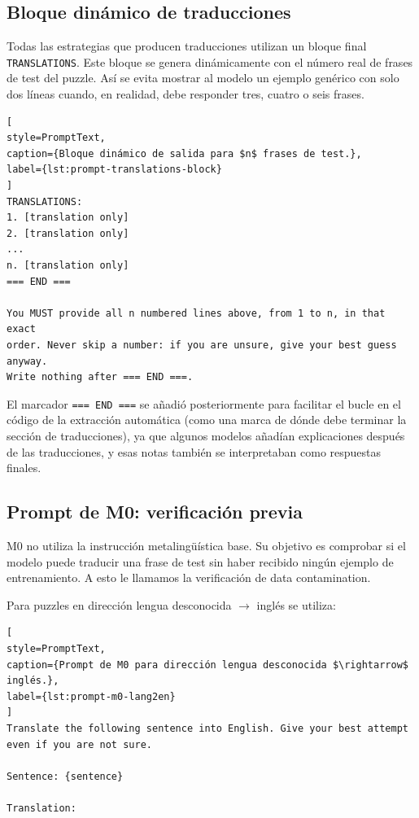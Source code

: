 \subsection{Bloque dinámico de traducciones}
\label{subsec:formato-salida}

Todas las estrategias que producen traducciones utilizan un bloque final \texttt{TRANSLATIONS}. Este bloque se genera dinámicamente con el número real de frases de test del puzzle. Así se evita mostrar al modelo un ejemplo genérico con solo dos líneas cuando, en realidad, debe responder tres, cuatro o seis frases.

\begin{lstlisting}[
style=PromptText,
caption={Bloque dinámico de salida para $n$ frases de test.},
label={lst:prompt-translations-block}
]
TRANSLATIONS:
1. [translation only]
2. [translation only]
...
n. [translation only]
=== END ===

You MUST provide all n numbered lines above, from 1 to n, in that exact
order. Never skip a number: if you are unsure, give your best guess anyway.
Write nothing after === END ===.
\end{lstlisting}

El marcador \texttt{=== END ===} se añadió posteriormente para facilitar el bucle en el código de la extracción automática (como una marca de dónde debe terminar la sección de traducciones), ya que algunos modelos añadían explicaciones después de las traducciones, y esas notas también se interpretaban como respuestas finales.

\subsection{Prompt de M0: verificación previa}
\label{subsec:prompt-m0}

M0 no utiliza la instrucción metalingüística base. Su objetivo es comprobar si el modelo puede traducir una frase de test sin haber recibido ningún ejemplo de entrenamiento. A esto le llamamos la verificación de data contamination.

Para puzzles en dirección lengua desconocida $\rightarrow$ inglés se utiliza:

\begin{lstlisting}[
style=PromptText,
caption={Prompt de M0 para dirección lengua desconocida $\rightarrow$ inglés.},
label={lst:prompt-m0-lang2en}
]
Translate the following sentence into English. Give your best attempt even if you are not sure.

Sentence: {sentence}

Translation:
\end{lstlisting}

